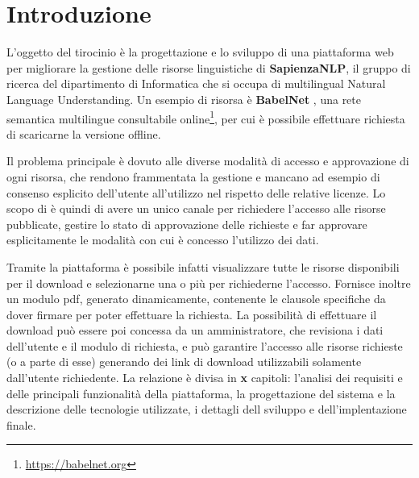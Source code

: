 
\chapter{Introduzione}

L'oggetto del tirocinio è la progettazione e lo sviluppo di una piattaforma web
per migliorare la gestione delle risorse linguistiche di \textbf{SapienzaNLP},
il gruppo di ricerca del dipartimento di Informatica che si occupa di multilingual
Natural Language Understanding.
Un esempio di risorsa è \textbf{BabelNet} \cite{NavigliPonzetto:12aij}, una rete
semantica multilingue consultabile online\footnote{\url{https://babelnet.org}},
per cui è possibile effettuare richiesta di scaricarne la versione offline.

Il problema principale è dovuto alle diverse modalità di accesso e approvazione
di ogni risorsa, che rendono frammentata la gestione e mancano ad esempio di
consenso esplicito dell'utente all'utilizzo nel rispetto delle relative licenze.
Lo scopo di è quindi di avere un unico canale per richiedere l'accesso alle
risorse pubblicate, gestire lo stato di approvazione delle richieste e far
approvare esplicitamente le modalità con cui è concesso l'utilizzo dei dati.

Tramite la piattaforma è possibile infatti visualizzare tutte le risorse
disponibili per il download e selezionarne una o più per richiederne l'accesso.
Fornisce inoltre un modulo pdf, generato dinamicamente, contenente le clausole
specifiche da dover firmare per poter effettuare la richiesta. La possibilità di
effettuare il download può essere poi concessa da un amministratore, che revisiona
i dati dell'utente e il modulo di richiesta, e può garantire l'accesso alle risorse
richieste (o a parte di esse) generando dei link di download utilizzabili
solamente dall'utente richiedente.
\newline
\newline
La relazione è divisa in {\textbf{\color{red}x}} capitoli:
l'analisi dei requisiti e delle principali funzionalità della piattaforma,
la progettazione del sistema e la descrizione delle tecnologie utilizzate,
i dettagli dell sviluppo e dell'implentazione finale.